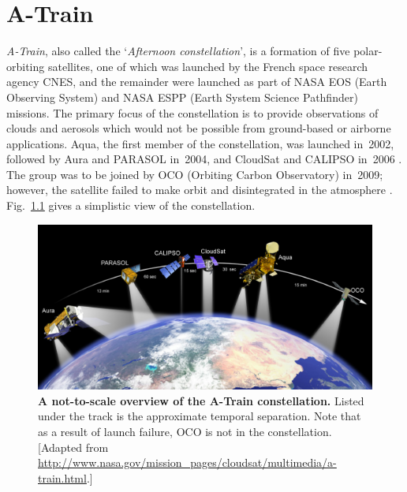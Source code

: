 \chapter{A-Train}
\textit{A-Train}, also called the `\textit{Afternoon constellation}', is a formation of five
polar-orbiting
satellites, one of which was launched by the French space research agency
CNES, and the remainder were launched as part of NASA EOS (Earth Observing
System) and NASA ESPP (Earth
System Science Pathfinder) missions.
The primary focus of the constellation is to provide observations of clouds and
aerosols which would not be possible from ground-based or airborne
applications.
Aqua, the first member of the constellation, was launched in~2002, followed by
Aura and PARASOL in~2004, and CloudSat and CALIPSO in~2006
\citep{A-TrainFactsheet2003, TheEarthObserverJun2006}. The group was to be
joined by OCO (Orbiting Carbon Observatory) in~2009; however, the satellite
failed to make orbit and disintegrated in the atmosphere
\citep{OCO_NatureGeoscienceApr2006}.
Fig.~\ref{fig:atrain-overview} gives a simplistic view of the constellation.

\begin{figure}[h]
\includegraphics[width=\textwidth]{images/atrain-overview.jpg}
\caption[A not-to-scale overview of the A-Train constellation]{\textbf{A not-to-scale overview of the A-Train constellation.} Listed
under the track is the approximate temporal separation. Note that as a
result of launch failure, OCO is not in the constellation. [Adapted from
\url{
http://www.nasa.gov/mission_pages/cloudsat/multimedia/a-train.html}.]}
\label{fig:atrain-overview}
\end{figure}

